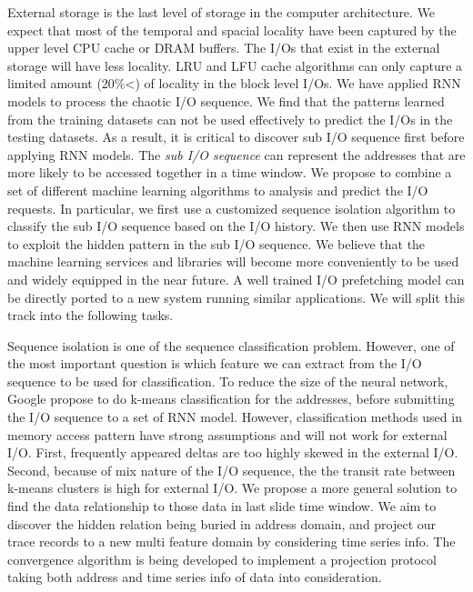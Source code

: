 External storage is the last level of storage in the computer architecture.
We expect that most of the temporal and spacial locality have been captured by the upper level CPU cache or DRAM buffers.
The I/Os that exist in the external storage will have less locality.
LRU and LFU cache algorithms can only capture a limited amount (20\%<) of locality in the block level I/Os.
We have applied RNN models to process the chaotic I/O sequence.
We find that the patterns learned from the training datasets can not be used effectively to predict the I/Os in the testing datasets.
As a result, it is critical to discover sub I/O sequence first before applying RNN models.
The \emph{sub I/O sequence} can represent the addresses that are more likely to be accessed together in a time window.
We propose to combine a set of different machine learning algorithms to analysis and predict the I/O requests.
In particular, we first use a customized sequence isolation algorithm to classify the sub I/O sequence based on the I/O history.
We then use RNN models to exploit the hidden pattern in the sub I/O sequence.
We believe that the machine learning services and libraries will become more conveniently to be used and widely equipped in the near future.
A well trained I/O prefetching model can be directly ported to a new system running similar applications.
We will split this track into the following tasks.


Sequence isolation is one of the sequence classification problem.
However, one of the most important question is which feature we can extract from the I/O sequence to be used for classification.
To reduce the size of the neural network, Google propose to do k-means classification for the addresses,
before submitting the I/O sequence to a set of RNN model\cite{hashemi2018learning}.
However, classification methods used in memory access pattern have strong assumptions and will not work for external I/O.
First, frequently appeared deltas are too highly skewed in the external I/O.
Second, because of mix nature of the I/O sequence, the the transit rate between k-means clusters is high for external I/O.
We propose a more general solution to find the data relationship to those data in last slide time window.
We aim to discover the hidden relation being buried in address domain,
and project our trace records to a new multi feature domain by considering time series info.
The convergence algorithm is being developed to implement a projection protocol
taking both address and time series info of data into consideration.

